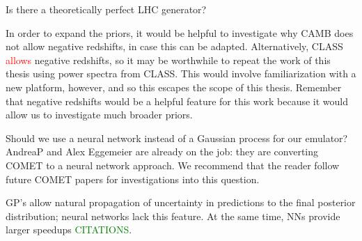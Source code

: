 \documentclass[11pt]{article}
\begin{document}
Is there a theoretically perfect LHC generator?

In order to expand the priors, it would be helpful to investigate why CAMB does not allow negative redshifts, in case this can be adapted. Alternatively, CLASS \textcolor{red}{allows} negative redshifts, so it may be worthwhile to repeat the work of this thesis using power spectra from CLASS. This would involve familiarization with a new platform, however, and so this escapes the scope of this thesis. Remember that negative redshifts would be a helpful feature for this work because it would allow us to investigate much broader priors.

Should we use a neural network instead of a Gaussian process for our emulator? AndreaP and Alex Eggemeier are already on the job: they are converting COMET to a neural network approach. We recommend that the reader follow future COMET papers for investigations into this question.

GP's allow natural propagation of
uncertainty in predictions to the final posterior distribution; neural
networks lack this feature. At the same time, NNs provide larger speedups \textcolor{green}{CITATIONS}.

 {
    \printbibliography
}
\end{document}
